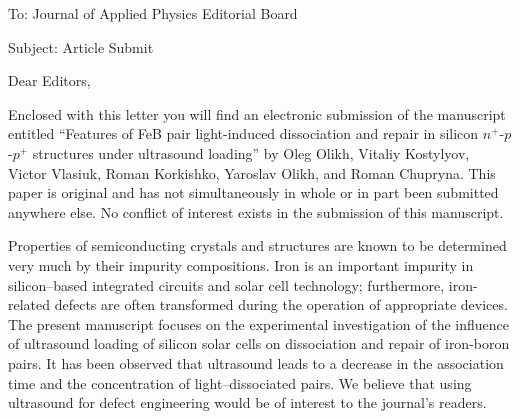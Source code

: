 \documentclass[preprint]{elsarticle}
\begin{document}
To:
Journal of Applied Physics Editorial Board


Subject:
Article Submit

\vspace{5mm}
Dear Editors,

\vspace{3mm}
Enclosed with this letter you will find an electronic submission of the ma\-nu\-script entitled ``Features of FeB pair light-induced dissociation and repair in silicon $n^+$-$p$-$p^+$ structures under ultrasound loading'' by Oleg Olikh, Vitaliy Kostylyov,
Victor Vlasiuk, Roman Korkishko, Yaroslav Olikh, and Roman Chupryna.
This paper is original and has not
simultaneously in whole or in part been submitted anywhere else.
No conflict of interest exists in the submission of this manuscript.

Properties of semiconducting crystals and structures are known to be determined very much by their impurity compositions.
Iron is an important impurity in silicon--based integrated circuits and solar cell technology; 
furthermore, iron-related defects are often transformed during the operation of appropriate devices.
The present manuscript focuses on the experimental investigation of the influence of ultrasound loading of silicon solar cells on dissociation and repair of iron-boron pairs.
It has been observed that ultrasound leads to a decrease in the association time and the concentration of light--dissociated pairs.
We believe that using ultrasound for defect engineering would be of interest to the journal’s readers.




\end{document}
